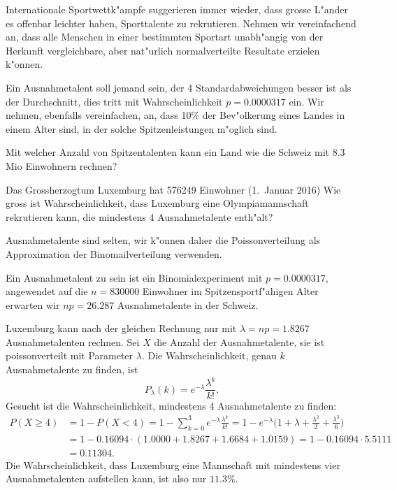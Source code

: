 Internationale Sportwettk"ampfe suggerieren immer wieder, dass grosse
L"ander es offenbar leichter haben, Sporttalente zu rekrutieren.
Nehmen wir vereinfachend an, dass alle Menschen in einer bestimmten Sportart
unabh"angig von der Herkunft vergleichbare, aber nat"urlich 
normalverteilte Resultate erzielen k"onnen.

Ein Ausnahmetalent soll jemand sein, der 4 Standardabweichungen
besser ist als der Durchschnitt, dies tritt mit Wahrscheinlichkeit
$p=0.0000317$ ein.
Wir nehmen, ebenfalls vereinfachen, an, dass 10\% der Bev"olkerung
eines Landes in einem Alter sind, in der solche Spitzenleistungen m"oglich
sind.
\begin{teilaufgaben}
\item
Mit welcher Anzahl von Spitzentalenten kann ein Land wie die Schweiz mit 
8.3 Mio Einwohnern rechnen?
\item 
Das Grossherzogtum Luxemburg hat 576249 Einwohner (1.~Januar 2016)
Wie gross ist Wahrscheinlichkeit, dass Luxemburg eine Olympiamannschaft
rekrutieren kann, die mindestens 4 Ausnahmetalente enth"alt?
\end{teilaufgaben}

\begin{loesung}
Ausnahmetalente sind selten, wir k"onnen daher die Poissonverteilung
als Approximation der Binomailverteilung verwenden.
\begin{teilaufgaben}
\item
Ein Ausnahmetalent zu sein ist ein Binomialexperiment mit $p=0.0000317$,
angewendet auf die $n=830000$ Einwohner im Spitzensportf"ahigen Alter
erwarten wir $np=26.287$ Ausnahmetalente in der Schweiz.
\item
Luxemburg kann nach der gleichen Rechnung nur mit
$\lambda = np = 1.8267$ Ausnahmetalenten rechnen.
Sei $X$ die Anzahl der Ausnahmetalente, sie ist poissonverteilt mit Parameter
$\lambda$.
Die Wahrscheinlichkeit, genau $k$ Ausnahmetalente zu finden, ist
\[
P_{\lambda}(k) = e^{-\lambda}\frac{\lambda^k}{k!}.
\]
Gesucht ist die Wahrscheinlichkeit, mindestens 4 Ausnahmetalente
zu finden:
\begin{align*}
P(X\ge 4)
&=
1-P(X<4)
=
1-\sum_{k=0}^3 e^{-\lambda}\frac{\lambda^k}{k!}
=
1-e^{-\lambda}\biggl(
1+\lambda+\frac{\lambda^2}{2} + \frac{\lambda^3}6
\biggr)
\\
&=
1-0.16094\cdot (1.0000 + 1.8267 + 1.6684 + 1.0159)
=
1-0.16094\cdot 5.5111
\\
&= 0.11304.
\end{align*}
Die Wahrscheinlichkeit, dass Luxemburg eine Mannschaft mit mindestens
vier Ausnahmetalenten aufstellen kann, ist also nur $11.3\%$.
\end{teilaufgaben}
\end{loesung}

\begin{bewertung}
\end{bewertung}


